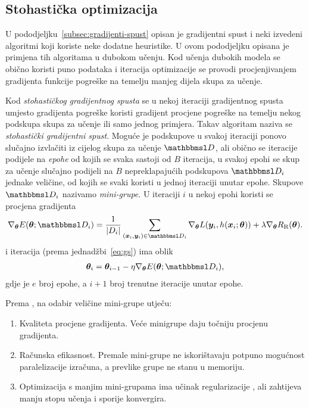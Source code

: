 \documentclass[utf8, diplomski, lmodern]{fer}
\begin{document}
\subsection{Stohastička optimizacija} \label{subsec:dukn-stoh-optimizacija}

U pododjeljku~\ref{subsec:gradijenti-spust} opisan je gradijentni spust i neki izvedeni algoritmi koji koriste neke dodatne heuristike. U ovom pododjeljku opisana je primjena tih algoritama u dubokom učenju. Kod učenja dubokih modela se obično koristi puno podataka i iteracija optimizacije se provodi procjenjivanjem gradijenta funkcije pogreške na temelju manjeg dijela skupa za učenje.

Kod \emph{stohastičkog gradijentnog spusta} se u nekoj iteraciji gradijentnog spusta umjesto gradijenta pogreške koristi gradijent procjene pogreške na temelju nekog podskupa skupa za učenje ili samo jednog primjera. Takav algoritam naziva se \emph{stohastički gradijentni spust}. Moguće je podskupove u svakoj iteraciji ponovo slučajno izvlačiti iz cijelog skupa za učenje $\set D$, ali obično se iteracije podijele na \emph{epohe} od kojih se svaka sastoji od $B$ iteracija, u svakoj epohi se skup za učenje slučajno podijeli na $B$ nepreklapajućih podskupova $\set D_i$ jednake veličine, od kojih se svaki koristi u jednoj iteraciji unutar epohe. Skupove $\set D_i$ nazivamo \emph{mini-grupe}. U iteraciji $i$ u nekoj epohi koristi se procjena gradijenta
\begin{align} \label{eq:sgs-ucenje}
\nabla_{\vec\theta}E(\vec\theta;\set D_i) = \frac{1}{\envert{D_i}}\sum_{(\vec x_i,\vec y_i)\in\set D_i} \nabla_{\vec\theta}L(\vec y_i,h(\vec x_i;\vec\theta)) + \lambda \nabla_{\vec\theta}R_\text{R}(\vec\theta) \text{.}
\end{align}
i iteracija (prema jednadžbi~\eqref{eq:gs}) ima oblik
\begin{align} \label{eq:sgs}
\vec \theta_i = \vec \theta_{i-1} - \eta\nabla_{\vec\theta}E(\vec\theta;\set D_{i})\text{,}
\end{align}
gdje je $e$ broj epohe, a $i+1$ broj trenutne iteracije unutar epohe.

Prema \citet{Goodfellow:2016:DL}, na odabir veličine mini-grupe utječu:
\begin{enumerate}
	\item Kvaliteta procjene gradijenta. Veće minigrupe daju točniju procjenu gradijenta.
	\item Računska efikasnost. Premale mini-grupe ne iskorištavaju potpuno mogućnost paralelizacije izračuna, a prevlike grupe ne stanu u memoriju.
	\item Optimizacija s manjim mini-grupama ima učinak regularizacije \citep{Wilson:2003:GIBTGDL}, ali zahtijeva manju stopu učenja i sporije konvergira.
\end{enumerate}
\end{document}
